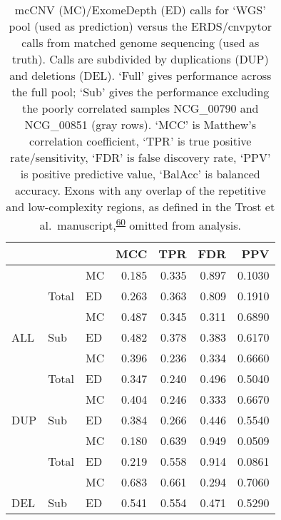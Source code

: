 \documentclass[11pt,letterpaper]{book}
\begin{document}
\begin{table}

\caption[mcCNV and ExomeDepth performance predicting calls from genome sequencing.]{\label{tab:predMet}mcCNV (MC)/ExomeDepth (ED) calls for `WGS' pool (used as prediction) versus the ERDS/cnvpytor calls from matched genome sequencing (used as truth). Calls are subdivided by duplications (DUP) and deletions (DEL). `Full' gives performance across the full pool; `Sub' gives the performance excluding the poorly correlated samples NCG\_00790 and NCG\_00851 (gray rows). `MCC' is Matthew's correlation coefficient, `TPR' is true positive rate/sensitivity, `FDR' is false discovery rate, `PPV' is positive predictive value, `BalAcc' is balanced accuracy. Exons with any overlap of the repetitive and low-complexity regions, as defined in the Trost et al.~manuscript,\textsuperscript{\protect\hyperlink{ref-trost:2018aa}{60}} omitted from analysis.}
\centering
\begin{tabular}[t]{lllrrrr}
\toprule
 &  &  & MCC & TPR & FDR & PPV\\
\midrule
 &  & MC & 0.185 & 0.335 & 0.897 & 0.1030\\
\cmidrule{3-7}
 & \multirow{-2}{*}{\raggedright\arraybackslash Total} & ED & 0.263 & 0.363 & 0.809 & 0.1910\\
\cmidrule{2-7}
 &  & MC & 0.487 & 0.345 & 0.311 & 0.6890\\
\cmidrule{3-7}
\multirow{-4}{*}{\raggedright\arraybackslash ALL} & \multirow{-2}{*}{\raggedright\arraybackslash Sub} & ED & 0.482 & 0.378 & 0.383 & 0.6170\\
\cmidrule{1-7}
 &  & MC & 0.396 & 0.236 & 0.334 & 0.6660\\
\cmidrule{3-7}
 & \multirow{-2}{*}{\raggedright\arraybackslash Total} & ED & 0.347 & 0.240 & 0.496 & 0.5040\\
\cmidrule{2-7}
 &  & MC & 0.404 & 0.246 & 0.333 & 0.6670\\
\cmidrule{3-7}
\multirow{-4}{*}{\raggedright\arraybackslash DUP} & \multirow{-2}{*}{\raggedright\arraybackslash Sub} & ED & 0.384 & 0.266 & 0.446 & 0.5540\\
\cmidrule{1-7}
 &  & MC & 0.180 & 0.639 & 0.949 & 0.0509\\
\cmidrule{3-7}
 & \multirow{-2}{*}{\raggedright\arraybackslash Total} & ED & 0.219 & 0.558 & 0.914 & 0.0861\\
\cmidrule{2-7}
 &  & MC & 0.683 & 0.661 & 0.294 & 0.7060\\
\cmidrule{3-7}
\multirow{-4}{*}{\raggedright\arraybackslash DEL} & \multirow{-2}{*}{\raggedright\arraybackslash Sub} & ED & 0.541 & 0.554 & 0.471 & 0.5290\\
\bottomrule
\end{tabular}
\end{table}
\end{document}
